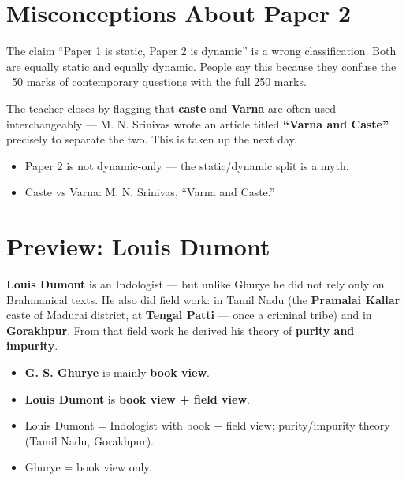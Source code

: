 \section{Misconceptions About Paper 2}

\begin{CriticalPoint}
The claim ``Paper 1 is static, Paper 2 is dynamic'' is a wrong classification. Both are equally static and equally dynamic. People say this because they confuse the ~50 marks of contemporary questions with the full 250 marks.
\end{CriticalPoint}

The teacher closes by flagging that \textbf{caste} and \textbf{Varna} are often used interchangeably --- M. N. Srinivas wrote an article titled \textbf{``Varna and Caste''} precisely to separate the two. This is taken up the next day.

\begin{QuickRevision}
\begin{itemize}
\item Paper 2 is not dynamic-only --- the static/dynamic split is a myth.
\item Caste vs Varna: M. N. Srinivas, ``Varna and Caste.''
\end{itemize}
\end{QuickRevision}

\section{Preview: Louis Dumont}

\textbf{Louis Dumont} is an Indologist --- but unlike Ghurye he did not rely only on Brahmanical texts. He also did field work: in Tamil Nadu (the \textbf{Pramalai Kallar} caste of Madurai district, at \textbf{Tengal Patti} --- once a criminal tribe) and in \textbf{Gorakhpur}. From that field work he derived his theory of \textbf{purity and impurity}.

\begin{ComparisonBox}
\begin{itemize}
\item \textbf{G. S. Ghurye} is mainly \textbf{book view}.
\item \textbf{Louis Dumont} is \textbf{book view + field view}.
\end{itemize}
\end{ComparisonBox}

\begin{QuickRevision}
\begin{itemize}
\item Louis Dumont = Indologist with book + field view; purity/impurity theory (Tamil Nadu, Gorakhpur).
\item Ghurye = book view only.
\end{itemize}
\end{QuickRevision}
